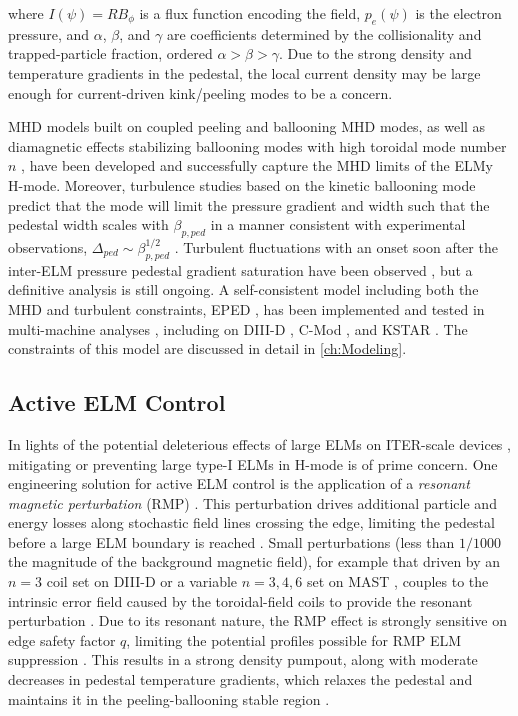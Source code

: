\noindent where $I(\psi) = RB_\phi$ is a flux function encoding the field, $p_e(\psi)$ is the electron pressure, and $\alpha$, $\beta$, and $\gamma$ are coefficients determined by the collisionality and trapped-particle fraction, ordered $\alpha > \beta > \gamma$.  Due to the strong density and temperature gradients in the pedestal, the local current density may be large enough for current-driven kink/peeling modes to be a concern.  

MHD models built on coupled peeling and ballooning MHD modes, as well as diamagnetic effects stabilizing ballooning modes with high toroidal mode number $n$ \cite{Suttrop2000}, have been developed \cite{Snyder2002,Turnbull2003} and successfully capture the MHD limits of the ELMy H-mode.  Moreover, turbulence studies based on the kinetic ballooning mode \cite{Tang1980} predict that the mode will limit the pressure gradient and width such that the pedestal width scales with $\beta_{p,ped}$ in a manner consistent with experimental observations, $\Delta_{ped} \sim \beta_{p,ped}^{1/2}$ \cite{Snyder2001}.  Turbulent fluctuations with an onset soon after the inter-ELM pressure pedestal gradient saturation have been observed \cite{Diallo2014}, but a definitive analysis is still ongoing.  A self-consistent model including both the MHD and turbulent constraints, EPED \cite{Snyder2009}, has been implemented and tested in multi-machine analyses \cite{Groebner2013}, including on DIII-D \cite{Snyder2012}, C-Mod \cite{
Walk2012}, and KSTAR \cite{Han2013}.  The constraints of this model are discussed in detail in \cref{ch:Modeling}.

\subsection{Active ELM Control}\label{subsec:hcr_elmy_control}

In lights of the potential deleterious effects of large ELMs on ITER-scale devices \cite{Loarte2003,Federici2003}, mitigating or preventing large type-I ELMs in H-mode is of prime concern.  One engineering solution for active ELM control is the application of a \emph{resonant magnetic perturbation} (RMP) \cite{Evans2004,Moyer2005,Evans2006}.  This perturbation drives additional particle and energy losses along stochastic field lines crossing the edge, limiting the pedestal before a large ELM boundary is reached \cite{Evans2004,Moyer2005}.  Small perturbations (less than $1/1000$ the magnitude of the background magnetic field), for example that driven by an $n=3$ coil set on DIII-D \cite{Evans2004} or a variable $n=3,4,6$ set on MAST \cite{Kirk2013}, couples to the intrinsic error field caused by the toroidal-field coils to provide the resonant perturbation \cite{Moyer2005}.  Due to its resonant nature, the RMP effect is strongly sensitive on edge safety factor $q$, limiting the potential profiles possible 
for RMP ELM suppression \cite{Moyer2005}.  This results in a strong density pumpout, along with moderate decreases in pedestal temperature gradients, which relaxes the pedestal and maintains it in the peeling-ballooning stable region \cite{Evans2006,Snyder2012}.

